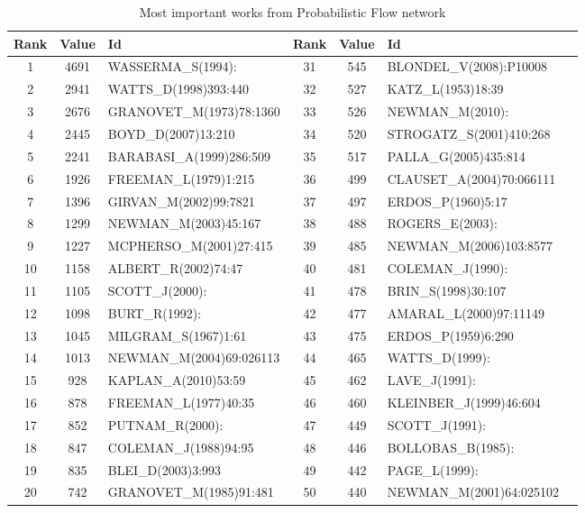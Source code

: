 \documentclass[11pt]{article} %
\begin{document}
\begin{table}
\caption{Most important works from Probabilistic Flow network}\label{pFlow}\medskip
\small
\renewcommand{\arraystretch}{0.9}
\small
\begin{tabular}{c|c|l||c|c|l|l}
Rank&   	Value&   	Id&   	Rank&   	Value&   	Id\\ \hline
1&   	4691&   	WASSERMA\_S(1994):&   	31&   	545&   	BLONDEL\_V(2008):P10008\\
2&   	2941&   	WATTS\_D(1998)393:440&   	32&   	527&   	KATZ\_L(1953)18:39\\
3&   	2676&   	GRANOVET\_M(1973)78:1360&   	33&   	526&   	NEWMAN\_M(2010):\\
4&   	2445&   	BOYD\_D(2007)13:210&   	34&   	520&   	STROGATZ\_S(2001)410:268\\
5&   	2241&   	BARABASI\_A(1999)286:509&   	35&   	517&   	PALLA\_G(2005)435:814\\
6&   	1926&   	FREEMAN\_L(1979)1:215&   	36&   	499&   	CLAUSET\_A(2004)70:066111\\
7&   	1396&   	GIRVAN\_M(2002)99:7821&   	37&   	497&   	ERDOS\_P(1960)5:17\\
8&   	1299&   	NEWMAN\_M(2003)45:167&   	38&   	488&   	ROGERS\_E(2003):\\
9&   	1227&   	MCPHERSO\_M(2001)27:415&   	39&   	485&   	NEWMAN\_M(2006)103:8577\\
10&   	1158&   	ALBERT\_R(2002)74:47&   	40&   	481&   	COLEMAN\_J(1990):\\
11&   	1105&   	SCOTT\_J(2000):&   	41&   	478&   	BRIN\_S(1998)30:107\\
12&   	1098&   	BURT\_R(1992):&   	42&   	477&   	AMARAL\_L(2000)97:11149\\
13&   	1045&   	MILGRAM\_S(1967)1:61&   	43&   	475&   	ERDOS\_P(1959)6:290\\
14&   	1013&   	NEWMAN\_M(2004)69:026113&   	44&   	465&   	WATTS\_D(1999):\\
15&   	928&   	KAPLAN\_A(2010)53:59&   	45&   	462&   	LAVE\_J(1991):\\
16&   	878&   	FREEMAN\_L(1977)40:35&   	46&   	460&   	KLEINBER\_J(1999)46:604\\
17&   	852&   	PUTNAM\_R(2000):&   	47&   	449&   	SCOTT\_J(1991):\\
18&   	847&   	COLEMAN\_J(1988)94:95&   	48&   	446&   	BOLLOBAS\_B(1985):\\
19&   	835&   	BLEI\_D(2003)3:993&   	49&   	442&   	PAGE\_L(1999):\\
20&   	742&   	GRANOVET\_M(1985)91:481&   	50&   	440&   	NEWMAN\_M(2001)64:025102\\

\end{tabular}
\end{table}
\end{document}
